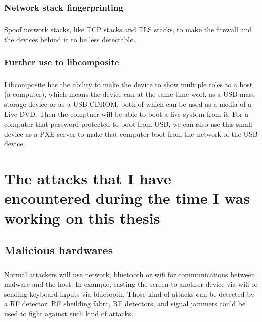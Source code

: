 \documentclass[mscthesis]{usiinfthesis}
\begin{document}
\subsection{Network stack fingerprinting}
\paragraph{}
Spoof network stacks, like TCP stacks and TLS stacks, to make the firewall and the devices behind it to be less detectable.

\subsection{Further use to libcomposite}
\paragraph{}
Libcomposite has the ability to make the device to show multiple roles to a host (a computer), which means the device can at the same time work as a USB mass storage device or as a USB CDROM, both of which can be used as a media of a Live DVD. Then the comptuer will be able to boot a live system from it. For a computer that password protected to boot from USB, we can also use this small device as a PXE server to make that computer boot from the network of the USB device.

\chapter{The attacks that I have encountered during the time I was working on this thesis}

\section{Malicious hardwares}
\paragraph{}
Normal attackers will use network, bluetooth or wifi for communications between malware and the host. In example, casting the screen to another device via wifi or sending keyboard inputs via bluetooth. Those kind of attacks can be detected by a RF detector. RF sheilding fabrc, RF detectors, and signal jammers could be used to fight against such kind of attacks.
\end{document}
